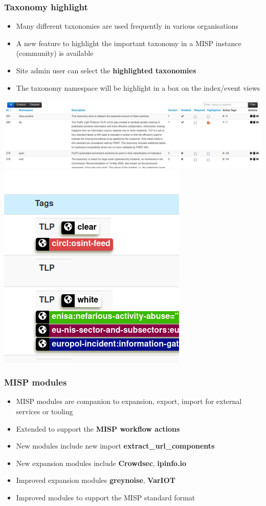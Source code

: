 \begin{frame}
\frametitle{Taxonomy highlight}
\begin{itemize}
    \item Many different taxonomies are used frequently in various organisations
    \item A new feature to highlight the important taxonomy in a MISP instance (community) is available
    \item Site admin user can select the {\bf highlighted taxonomies}
    \item The taxonomy namespace will be highlight in a box on the index/event views
\end{itemize}
    \includegraphics[scale=0.2]{./images/highlight.png}
    \includegraphics[scale=0.2]{./images/highlight2.png}
\end{frame}

\begin{frame}
\frametitle{MISP modules}
    \begin{itemize}
        \item MISP modules are companion to expansion, export, import for external services or tooling
        \item Extended to support the {\bf MISP workflow actions}
        \item New modules include new import {\bf extract\_url\_components}
        \item New expansion modules include {\bf Crowdsec}, {\bf ipinfo.io}
        \item Improved expansion modules  {\bf greynoise}, {\bf VarIOT}
        \item Improved modules to support the MISP standard format
    \end{itemize}
\end{frame}

